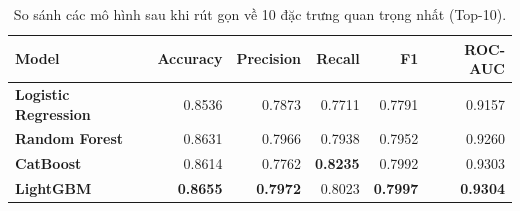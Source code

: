 \begin{table}[H]
  \centering
  \caption{So sánh các mô hình sau khi rút gọn về 10 đặc trưng quan trọng nhất (Top-10).}
  \label{tab:compare_top10}
  \small
  \setlength{\tabcolsep}{5pt}
  \begin{tabular}{lrrrrr}
    \toprule
    \textbf{Model} & \textbf{Accuracy} & \textbf{Precision} & \textbf{Recall} & \textbf{F1} & \textbf{ROC-AUC} \\
    \midrule
    \textbf{Logistic Regression} & 0.8536 & 0.7873 & 0.7711 & 0.7791 & 0.9157 \\
    \textbf{Random Forest} & 0.8631 & 0.7966 & 0.7938 & 0.7952 & 0.9260 \\
    \textbf{CatBoost} & 0.8614 & 0.7762 & \textbf{0.8235} & 0.7992 & 0.9303 \\
    \textbf{LightGBM} & \textbf{0.8655} & \textbf{0.7972} & 0.8023 & \textbf{0.7997} & \textbf{0.9304} \\
    \bottomrule
  \end{tabular}
\end{table}
